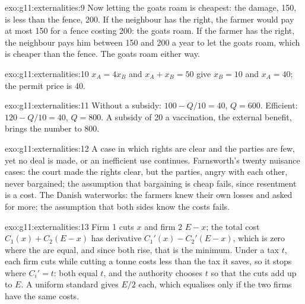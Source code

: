\begin{solution}{exo:g11:externalities:9}
Now letting the goats roam is cheapest: the damage, 150, is less than the fence, 200. If the neighbour has the right, the farmer would pay at most 150 for a fence costing
200: the goats roam. If the farmer has the right, the neighbour pays him between 150 and 200 a year to let the goats roam, which is cheaper than the fence. The goats roam
either way.
\end{solution}

\begin{solution}{exo:g11:externalities:10}
$x_A = 4x_B$ and $x_A + x_B = 50$ give $x_B = 10$ and $x_A = 40$; the permit price is 40.
\end{solution}

\begin{solution}{exo:g11:externalities:11}
Without a subsidy: $100 - Q/10 = 40$, $Q = 600$. Efficient: $120 - Q/10 = 40$, $Q = 800$. A subsidy of 20 a vaccination, the external benefit, brings the number to 800.
\end{solution}

\begin{solution}{exo:g11:externalities:12}
A case in which rights are clear and the parties are few, yet no deal is made, or an inefficient use continues. Farnsworth's twenty nuisance cases: the court made the
rights clear, but the parties, angry with each other, never bargained; the assumption that bargaining is cheap fails, since resentment is a cost. The Danish waterworks: the
farmers knew their own losses and asked for more; the assumption that both sides know the costs fails.
\end{solution}

\begin{solution}{exo:g11:externalities:13}
Firm 1 cuts $x$ and firm 2 $E - x$; the total cost $C_1(x) + C_2(E - x)$ has derivative $C_1'(x) - C_2'(E - x)$, which is zero where the  are equal, and since
both rise, that is the minimum. Under a tax $t$, each firm cuts while cutting a tonne costs less than the tax it saves, so it stops where $C_i' = t$: both  equal
$t$, and the authority chooses $t$ so that the cuts add up to $E$. A uniform standard gives $E/2$ each, which equalises  only if the two firms have the same costs.
\end{solution}

